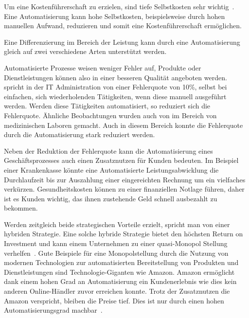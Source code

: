
Um eine Kostenführerschaft zu erzielen, sind tiefe Selbstkosten sehr wichtig~\autocite{Capaul2010}. Eine Automatisierung kann hohe Selbstkosten, beispielsweise durch hohen manuellen Aufwand, reduzieren und somit eine Kostenführerschaft ermöglichen. 

Eine Differenzierung im Bereich der Leistung kann durch eine Automatisierung gleich auf zwei verschiedene Arten unterstützt werden. 

Automatisierte Prozesse weisen weniger Fehler auf, Produkte oder Dienstleistungen können also in einer besseren Qualität angeboten werden. \textcite{Kregassner2012} spricht in der IT Administration von einer Fehlerquote von 10\%, selbst bei einfachen, sich wiederholenden Tätigkeiten, wenn diese manuell ausgeführt werden. Werden diese Tätigkeiten automatisiert, so reduziert sich die Fehlerquote. Ähnliche Beobachtungen wurden auch von \textcite{Uettwiller-Geiger2005} im Bereich von medizinischen Laboren gemacht. Auch in diesem Bereich konnte die Fehlerquote durch die Automatisierung stark reduziert werden. 

Neben der Reduktion der Fehlerquote kann die Automatisierung eines Geschäftsprozesses auch einen Zusatznutzen für Kunden bedeuten. Im Beispiel einer Krankenkasse könnte eine Automatisierte Leistungsabwicklung die Durchlaufzeit bis zur Auszahlung einer eingereichten Rechnung um ein vielfaches verkürzen. Gesundheitskosten können zu einer finanziellen Notlage führen, daher ist es Kunden wichtig, das ihnen zustehende Geld schnell ausbezahlt zu bekommen. 

Werden zeitgleich beide strategischen Vorteile erzielt, spricht man von einer hybriden Strategie. Eine solche hybride Strategie bietet den höchsten Return on Investment und kann einem Unternehmen zu einer quasi-Monopol Stellung verhelfen~\autocite{Lombriser2010}. Gute Beispiele für eine Monopolstellung durch die Nutzung von modernen Technologien zur automatisierten Bereitstellung von Produkten und Dienstleistungen sind Technologie-Giganten wie Amazon. Amazon ermöglicht dank einem hohen Grad an Automatisierung ein Kundenerlebnis wie dies kein anderen Online-Händler zuvor erreichen konnte. Trotz der Zusatznutzen die Amazon verspricht, bleiben die Preise tief. Dies ist nur durch einen hohen Automatisierungsgrad machbar~\autocite{Kha2000}.

